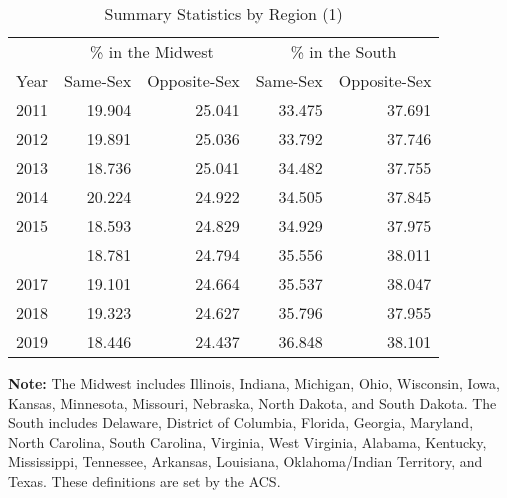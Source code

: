 \begin{table}[htbp]

\caption{Summary Statistics by Region (1)}
\label{region_1} %
\centering
\begin{tabular}[t]{rrrrr}
\toprule
\multicolumn{1}{c}{ } & \multicolumn{2}{c}{\% in the Midwest} & \multicolumn{2}{c}{\% in the South} \\
\cmidrule(l{3pt}r{3pt}){2-3} \cmidrule(l{3pt}r{3pt}){4-5}
Year & Same-Sex & Opposite-Sex & Same-Sex & Opposite-Sex\\
\midrule
2011 & 19.904 & 25.041 & 33.475 & 37.691\\
2012 & 19.891 & 25.036 & 33.792 & 37.746\\
2013 & 18.736 & 25.041 & 34.482 & 37.755\\
2014 & 20.224 & 24.922 & 34.505 & 37.845\\
2015 & 18.593 & 24.829 & 34.929 & 37.975\\
\addlinespace
2016 & 18.781 & 24.794 & 35.556 & 38.011\\
2017 & 19.101 & 24.664 & 35.537 & 38.047\\
2018 & 19.323 & 24.627 & 35.796 & 37.955\\
2019 & 18.446 & 24.437 & 36.848 & 38.101\\
\bottomrule
\end{tabular}
\vspace{0.5em}
\begin{minipage}{0.85\textwidth} %
\small \textbf{Note:} The Midwest includes Illinois, Indiana, Michigan, Ohio, Wisconsin, Iowa, Kansas, Minnesota, Missouri, Nebraska, North Dakota, and South Dakota. The South includes Delaware, District of Columbia, Florida, Georgia, Maryland, North Carolina, South Carolina, Virginia, West Virginia, Alabama, Kentucky, Mississippi, Tennessee, Arkansas, Louisiana, Oklahoma/Indian Territory, and Texas. These definitions are set by the ACS.
\end{minipage}
\end{table}
